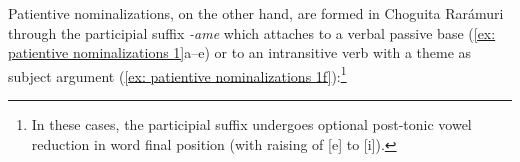 \z
\z















Patientive nominalizations, on the other hand, are formed in Choguita Rarámuri through the participial suffix \textit{-ame} which attaches to a verbal passive base (\ref{ex: patientive nominalizations 1}a--e) or to an intransitive verb with a theme as subject argument (\ref{ex: patientive nominalizations 1f}):\footnote{In these cases, the participial suffix undergoes optional post-tonic vowel reduction in word final position (with raising of [e] to [i]).}

